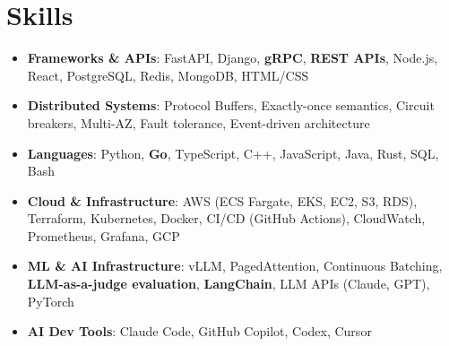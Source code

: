 \documentclass[letterpaper,11pt]{article}
\newcommand{\resumeSubHeadingListStart}{\begin{itemize}[leftmargin=0.15in, label={}]}
\newcommand{\resumeSubHeadingListEnd}{\end{itemize}}
\newcommand{\resumeSkillHeading}[2]{%
  \item\small{\textbf{#1}: #2 \vspace{-9pt}}%
}
\begin{document}
\section{Skills}
  \resumeSubHeadingListStart
    \resumeSkillHeading{Frameworks \& APIs}{FastAPI, Django, \textbf{gRPC}, \textbf{REST APIs}, Node.js, React, PostgreSQL, Redis, MongoDB, HTML/CSS}
    \resumeSkillHeading{Distributed Systems}{Protocol Buffers, Exactly-once semantics, Circuit breakers, Multi-AZ, Fault tolerance, Event-driven architecture}
    \resumeSkillHeading{Languages}{Python, \textbf{Go}, TypeScript, C++, JavaScript, Java, Rust, SQL, Bash}
    \resumeSkillHeading{Cloud \& Infrastructure}{AWS (ECS Fargate, EKS, EC2, S3, RDS), Terraform, Kubernetes, Docker, CI/CD (GitHub Actions), CloudWatch, Prometheus, Grafana, GCP}
    \resumeSkillHeading{ML \& AI Infrastructure}{vLLM, PagedAttention, Continuous Batching, \textbf{LLM-as-a-judge evaluation}, \textbf{LangChain}, LLM APIs (Claude, GPT), PyTorch}
    \resumeSkillHeading{AI Dev Tools}{Claude Code, GitHub Copilot, Codex, Cursor}
  \resumeSubHeadingListEnd
\end{document}
